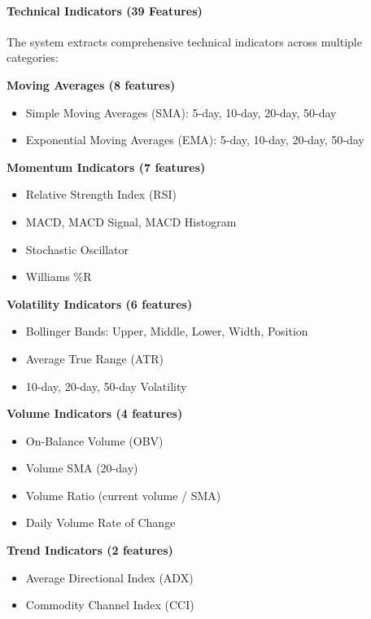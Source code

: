 \documentclass[
]{article}
\begin{document}
\paragraph{\texorpdfstring{\textbf{Technical Indicators (39
Features)}}{Technical Indicators (39 Features)}}\label{technical-indicators-39-features}

The system extracts comprehensive technical indicators across multiple
categories:

\textbf{Moving Averages (8 features)}

\begin{itemize}
\item
  Simple Moving Averages (SMA): 5-day, 10-day, 20-day, 50-day
\item
  Exponential Moving Averages (EMA): 5-day, 10-day, 20-day, 50-day
\end{itemize}

\textbf{Momentum Indicators (7 features)}

\begin{itemize}
\item
  Relative Strength Index (RSI)
\item
  MACD, MACD Signal, MACD Histogram
\item
  Stochastic Oscillator
\item
  Williams \%R
\end{itemize}

\textbf{Volatility Indicators (6 features)}

\begin{itemize}
\item
  Bollinger Bands: Upper, Middle, Lower, Width, Position
\item
  Average True Range (ATR)
\item
  10-day, 20-day, 50-day Volatility
\end{itemize}

\textbf{Volume Indicators (4 features)}

\begin{itemize}
\item
  On-Balance Volume (OBV)
\item
  Volume SMA (20-day)
\item
  Volume Ratio (current volume / SMA)
\item
  Daily Volume Rate of Change
\end{itemize}

\textbf{Trend Indicators (2 features)}

\begin{itemize}
\item
  Average Directional Index (ADX)
\item
  Commodity Channel Index (CCI)
\end{itemize}
\end{document}
